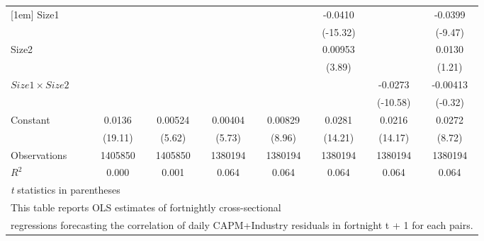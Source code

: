 {\begin{tabular}{l*{7}{c}}
[1em]
Size1               &                     &                     &                     &                     &     -0.0410\sym{***}&                     &     -0.0399\sym{***}\\
                    &                     &                     &                     &                     &    (-15.32)         &                     &     (-9.47)         \\
[1em]
Size2               &                     &                     &                     &                     &     0.00953\sym{***}&                     &      0.0130         \\
                    &                     &                     &                     &                     &      (3.89)         &                     &      (1.21)         \\
[1em]
$ Size1 \times Size2 $&                     &                     &                     &                     &                     &     -0.0273\sym{***}&    -0.00413         \\
                    &                     &                     &                     &                     &                     &    (-10.58)         &     (-0.32)         \\
[1em]
Constant            &      0.0136\sym{***}&     0.00524\sym{***}&     0.00404\sym{***}&     0.00829\sym{***}&      0.0281\sym{***}&      0.0216\sym{***}&      0.0272\sym{***}\\
                    &     (19.11)         &      (5.62)         &      (5.73)         &      (8.96)         &     (14.21)         &     (14.17)         &      (8.72)         \\
\hline
Observations        &     1405850         &     1405850         &     1380194         &     1380194         &     1380194         &     1380194         &     1380194         \\
\(R^{2}\)           &       0.000         &       0.001         &       0.064         &       0.064         &       0.064         &       0.064         &       0.064         \\
\hline\hline
\multicolumn{8}{l}{\footnotesize \textit{t} statistics in parentheses}\\
\multicolumn{8}{l}{\footnotesize This table reports OLS estimates of fortnightly cross-sectional}\\
\multicolumn{8}{l}{\footnotesize  regressions forecasting the correlation of daily CAPM+Industry residuals in fortnight t + 1 for each pairs.}\\

\end{tabular}}
